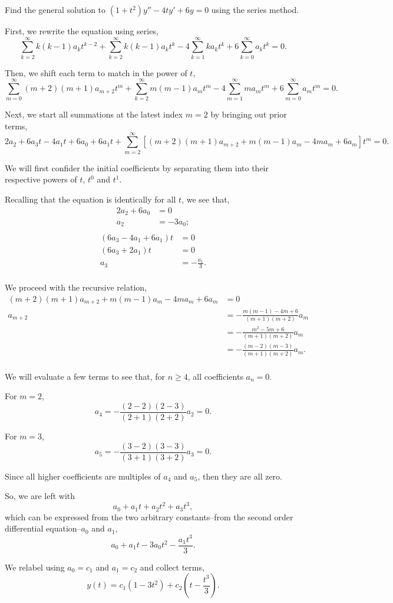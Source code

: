 \documentclass[../hw8]{subfiles}
\begin{document}
Find the general solution to $(1+t^2)y''-4ty'+6y=0$ using the series method.

First, we rewrite the equation using series,
\[\sum\limits_{k=2}^{\infty}k(k-1)a_k t^{k-2}+\sum\limits_{k=2}^{\infty}k(k-1)a_k t^k - 4 \sum\limits_{k=1}^{\infty}ka_k t^k + 6 \sum\limits_{k=0}^{\infty}a_k t^k=0.\]

Then, we shift each term to match in the power of $t$,
\[\sum\limits_{m=0}^{\infty}(m+2)(m+1)a_{m+2}t^m+\sum\limits_{k=2}^{\infty}m(m-1)a_m t^m-4 \sum\limits_{m=1}^{\infty}ma_m t^m+6 \sum\limits_{m=0}^{\infty}a_m t^m=0.\]

Next, we start all summations at the latest index $m=2$ by bringing out prior terms,
\[2a_2+6a_3t-4a_1t+6a_0+6a_1t+\sum\limits_{m=2}^{\infty}\left[ (m+2)(m+1)a_{m+2}+m(m-1)a_m-4ma_m+6a_m \right]t^m=0.\]

We will first confider the initial coefficients by separating them into their respective powers of $t$, $t^0$ and $t^1$.

Recalling that the equation is identically for all $t$, we see that,
\begin{align*}
    2a_2+6a_0&=0\\
    a_2&=-3a_0;\\
\end{align*}
\begin{align*}
    (6a_3-4a_1+6a_1)t&=0\\
    (6a_3+2a_1)t&=0\\
    a_3&=-\frac{a_1}{3}.\\
\end{align*}

We proceed with the recursive relation,
\begin{align*}
    (m+2)(m+1)a_{m+2}+m(m-1)a_m-4ma_m+6a_m&=0\\
    a_{m+2}&=-\frac{m(m-1)-4m+6}{(m+1)(m+2)}a_m\\
    &=-\frac{m^2-5m+6}{(m+1)(m+2)}a_m\\
    &=-\frac{(m-2)(m-3)}{(m+1)(m+2)}a_m.\\
\end{align*}

We will evaluate a few terms to see that, for $n\geq4$, all coefficients $a_n=0$.

For $m=2$, \[a_4=-\frac{(2-2)(2-3)}{(2+1)(2+2)}a_2=0.\]

For $m=3$, \[a_5=-\frac{(3-2)(3-3)}{(3+1)(3+2)}a_3=0.\]

Since all higher coefficients are multiples of $a_4$ and $a_5$, then they are all zero.

So, we are left with \[a_0+a_1t+a_2t^2+a_3t^3,\]
which can be expressed from the two arbitrary constants--from the second order differential equation--$a_0$ and $a_1$, \[a_0+a_1t-3a_0t^2-\frac{a_1t^3}{3}.\]

We relabel using $a_0=c_1$ and $a_1=c_2$ and collect terms,
\[y(t)=c_1(1-3t^2)+c_2\left( t-\frac{t^3}{3} \right).\]
\end{document}
